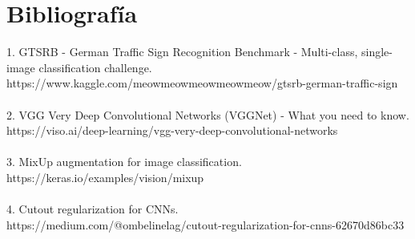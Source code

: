 \documentclass[12pt]{article}
\begin{document}
\newpage

\section*{Bibliografía}
1. GTSRB - German Traffic Sign Recognition Benchmark - Multi-class, single-image classification challenge.
\\
https://www.kaggle.com/meowmeowmeowmeowmeow/gtsrb-german-traffic-sign
\\\\
2. VGG Very Deep Convolutional Networks (VGGNet) - What you need to know.
\\
https://viso.ai/deep-learning/vgg-very-deep-convolutional-networks
\\\\
3. MixUp augmentation for image classification.
\\
https://keras.io/examples/vision/mixup
\\\\
4. Cutout regularization for CNNs.
\\
https://medium.com/@ombelinelag/cutout-regularization-for-cnns-62670d86bc33
\end{document}
